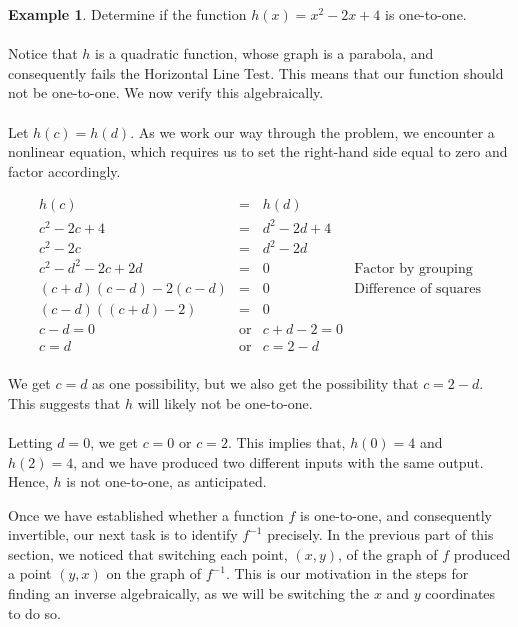 \documentclass[11pt]{book}
\theoremstyle{definition}  %
\newtheorem{example}{Example}[chapter]
\begin{document}
\begin{example} Determine if the function $h(x) = x^2 - 2x+4$ is one-to-one.\\
~\\
Notice that $h$ is a quadratic function, whose graph is a parabola, and consequently fails the Horizontal Line Test.  This means that our function should not be one-to-one.  We now verify this algebraically.\\
~\\
Let $h(c) = h(d)$.  As we work our way through the problem, we encounter a nonlinear equation, which requires us to set the right-hand side equal to zero and factor accordingly.

\[ \begin{array}{rclr}

h(c) & = & h(d) & \\
c^2 - 2c+4 & = & d^2 - 2d+4 & \\

c^2 - 2c & = & d^2 - 2d & \\

c^2 - d^2 - 2c + 2d & = & 0 & \mbox{Factor by grouping} \\

(c+d)(c-d) - 2(c-d) & = & 0 & \mbox{Difference of squares}\\

(c-d)((c+d) -2) & = & 0 & \\

c-d = 0 & \mbox{or} & c+d -2 = 0 & \\

c = d & \mbox{or} & c = 2-d & \\

\end{array} \]

We get $c=d$ as one possibility, but we also get the possibility that $c=2-d$.  This suggests that $h$ will likely not be one-to-one.\\
~\\
Letting $d=0$, we get $c = 0$ or $c = 2$.  This implies that, $h(0) = 4$ and $h(2) = 4$, and we have produced two different inputs with the same output.  Hence, $h$ is not one-to-one, as anticipated.
\end{example}

Once we have established whether a function $f$ is one-to-one, and consequently invertible, our next task is to identify $f^{-1}$ precisely.  In the previous part of this section, we noticed that switching each point, $(x,y)$, of the graph of $f$ produced a point $(y,x)$ on the graph of $f^{-1}$. This is our motivation in the steps for finding an inverse algebraically, as we will be switching the $x$ and $y$ coordinates to do so.
\end{document}
